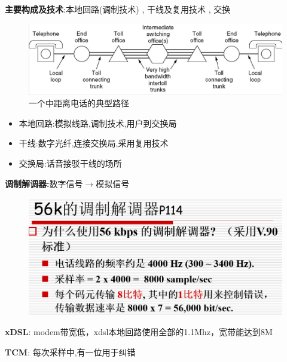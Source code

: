 \documentclass[UTF8,a4paper]{ctexart}
\begin{document}
  \textbf{主要构成及技术}:本地回路(调制技术) , 干线及复用技术 , 交换

  \begin{figure}[H]
    \centering
    \includegraphics[scale = 0.3]{assets/jisuanjiwangluo_3aee3.png}
    \caption{一个中距离电话的典型路径}
  \end{figure}

  \begin{itemize}
    \item 本地回路:模拟线路,调制技术,用户到交换局
    \item 干线:数字光纤,连接交换局,采用复用技术
    \item 交换局:话音接驳干线的场所
  \end{itemize}

  \textbf{调制解调器:}数字信号$\to$模拟信号


  \begin{figure}[H]
    \centering
    \includegraphics[scale = 0.3]{assets/jisuanjiwangluo_460b3.png}
  \end{figure}

  \textbf{xDSL}: modem带宽低，xdsl本地回路使用全部的1.1Mhz，宽带能达到8M

  \textbf{TCM}: 每次采样中,有一位用于纠错
\end{document}
